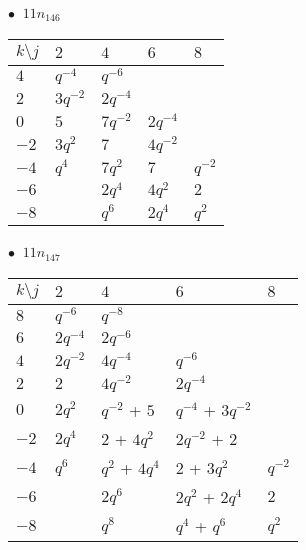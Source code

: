 %
\begin{minipage}{\linewidth}
$\bullet\ $ $11n_{146}$ \vspace{0.5em} \\
\begin{tabular}{l|llll}
$k \setminus j$ & $2$ & $4$ & $6$ & $8$ \\
\hline
$4$ & $q^{-4}$ & $q^{-6}$ &  &  \\
$2$ & $3q^{-2}$ & $2q^{-4}$ &  &  \\
$0$ & $5$ & $7q^{-2}$ & $2q^{-4}$ &  \\
$-2$ & $3q^{2}$ & $7$ & $4q^{-2}$ &  \\
$-4$ & $q^{4}$ & $7q^{2}$ & $7$ & $q^{-2}$ \\
$-6$ &  & $2q^{4}$ & $4q^{2}$ & $2$ \\
$-8$ &  & $q^{6}$ & $2q^{4}$ & $q^{2}$ \\
\end{tabular}
\vspace{2em}
\end{minipage}
%
\begin{minipage}{\linewidth}
$\bullet\ $ $11n_{147}$ \vspace{0.5em} \\
\begin{tabular}{l|llll}
$k \setminus j$ & $2$ & $4$ & $6$ & $8$ \\
\hline
$8$ & $q^{-6}$ & $q^{-8}$ &  &  \\
$6$ & $2q^{-4}$ & $2q^{-6}$ &  &  \\
$4$ & $2q^{-2}$ & $4q^{-4}$ & $q^{-6}$ &  \\
$2$ & $2$ & $4q^{-2}$ & $2q^{-4}$ &  \\
$0$ & $2q^{2}$ & $q^{-2}$ + $5$ & $q^{-4}$ + $3q^{-2}$ &  \\
$-2$ & $2q^{4}$ & $2$ + $4q^{2}$ & $2q^{-2}$ + $2$ &  \\
$-4$ & $q^{6}$ & $q^{2}$ + $4q^{4}$ & $2$ + $3q^{2}$ & $q^{-2}$ \\
$-6$ &  & $2q^{6}$ & $2q^{2}$ + $2q^{4}$ & $2$ \\
$-8$ &  & $q^{8}$ & $q^{4}$ + $q^{6}$ & $q^{2}$ \\
\end{tabular}
\vspace{2em}
\end{minipage}
%

